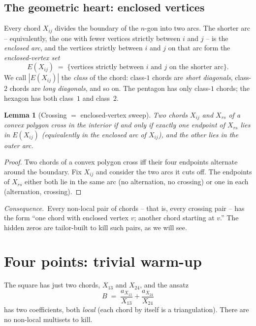 \documentclass[11pt]{article}
\newtheorem{lemma}{Lemma}
\begin{document}
\subsection{The geometric heart: enclosed vertices}

Every chord $X_{ij}$ divides the boundary of the $n$-gon into two arcs.
The shorter arc -- equivalently, the one with fewer vertices strictly
between $i$ and $j$ -- is the \emph{enclosed arc}, and the vertices
strictly between $i$ and $j$ on that arc form the \emph{enclosed-vertex
set}
\[
E(X_{ij}) \;=\; \{\text{vertices strictly between $i$ and $j$ on the shorter arc}\}.
\]
We call $|E(X_{ij})|$ the \emph{class} of the chord: class-$1$ chords
are \emph{short diagonals}, class-$2$ chords are \emph{long diagonals},
and so on. The pentagon has only class-$1$ chords; the hexagon has both
class~$1$ and class~$2$.

\begin{lemma}[Crossing $=$ enclosed-vertex sweep]\label{lem:cross}
Two chords $X_{ij}$ and $X_{rs}$ of a convex polygon cross in the
interior if and only if exactly one endpoint of $X_{rs}$ lies in
$E(X_{ij})$ (equivalently in the enclosed arc of $X_{ij}$), and the
other lies in the outer arc.
\end{lemma}
\begin{proof}
Two chords of a convex polygon cross iff their four endpoints alternate
around the boundary. Fix $X_{ij}$ and consider the two arcs it cuts off.
The endpoints of $X_{rs}$ either both lie in the same arc (no
alternation, no crossing) or one in each (alternation, crossing).
\end{proof}

\noindent\emph{Consequence.}\ Every non-local pair of chords -- that is,
every crossing pair -- has the form ``one chord with enclosed vertex
$v$; another chord starting at $v$.'' The hidden zeros are tailor-built
to kill such pairs, as we will see.

\section{Four points: trivial warm-up}

The square has just two chords, $X_{13}$ and $X_{24}$, and the ansatz
\[
B \;=\; \frac{a_{X_{13}}}{X_{13}} + \frac{a_{X_{24}}}{X_{24}}
\]
has two coefficients, both \emph{local} (each chord by itself is a
triangulation). There are no non-local multisets to kill.
\end{document}
